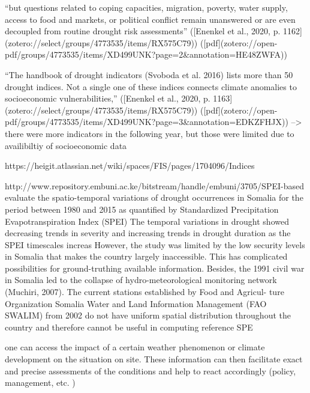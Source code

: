 “but questions related to coping capacities, migration, poverty, water supply, access to food and markets, or political conflict remain unanswered or are even decoupled from routine drought risk assessments” ([Enenkel et al., 2020, p. 1162](zotero://select/groups/4773535/items/RX575C79)) ([pdf](zotero://open-pdf/groups/4773535/items/XD499UNK?page=2&annotation=HE48ZWFA))

“The handbook of drought indicators (Svoboda et al. 2016) lists more than 50 drought indices. Not a single one of these indices connects climate anomalies to socioeconomic vulnerabilities,” ([Enenkel et al., 2020, p. 1163](zotero://select/groups/4773535/items/RX575C79)) ([pdf](zotero://open-pdf/groups/4773535/items/XD499UNK?page=3&annotation=EDKZFHJX))
--> there were more indicators in the following year, but those were limited due to availibiltiy of socioeconomic data


https://heigit.atlassian.net/wiki/spaces/FIS/pages/1704096/Indices


http://www.repository.embuni.ac.ke/bitstream/handle/embuni/3705/SPEI-based%
evaluate the spatio-temporal variations of drought occurrences in Somalia for the period between 1980 and 2015 as quantified by Standardized Precipitation Evapotranspiration Index (SPEI)
The temporal variations in drought showed decreasing trends in severity and increasing trends in drought duration as the SPEI timescales increas
However, the study was limited by the low security levels in Somalia that makes
the country largely inaccessible. This has complicated possibilities for
ground-truthing available information. Besides, the 1991 civil war in
Somalia led to the collapse of hydro-meteorological monitoring network
(Muchiri, 2007). The current stations established by Food and Agricul-
ture Organization Somalia Water and Land Information Management
(FAO SWALIM) from 2002 do not have uniform spatial distribution
throughout the country and therefore cannot be useful in computing
reference SPE

one can access the impact of a certain weather phenomenon or climate development on the situation on site. These information can then facilitate exact and precise assessments of the conditions and help to react accordingly (policy, management, etc. ) 


